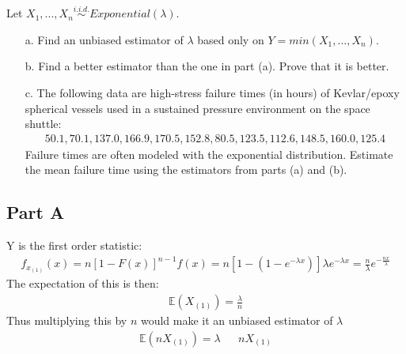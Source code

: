 \documentclass{article}
\begin{document}
Let $X_1,...,X_n \overset{i.i.d.}{\sim} Exponential(\lambda)$.
\begin{enumerate}
\item[a.] Find an unbiased estimator of $\lambda$ based only on $Y=min(X_1,...,X_n)$.
\item[b.] Find a better estimator than the one in part (a). Prove that it is better.
\item[c.] The following data are high-stress failure times (in hours) of Kevlar/epoxy spherical vessels used in a sustained pressure environment on the space shuttle:
\begin{align*}
50.1, 70.1, 137.0, 166.9, 170.5, 152.8, 80.5, 123.5, 112.6, 148.5, 160.0, 125.4
\end{align*}
Failure times are often modeled with the exponential distribution. Estimate the mean failure time using the estimators from parts (a) and (b).
\end{enumerate}
\subsection*{Part A}
Y is the first order statistic:
\begin{align*}
f_{x_{(1)}}(x) = n[1-F(x)]^{n-1} f(x) = n[1-(1-e^{-\lambda x})] \lambda e^{-\lambda x} = \frac{n}{\lambda} e^{-\frac{nx}{\lambda}}
\end{align*}
The expectation of this is then:
\begin{align*}
\mathbb{E}(X_{(1)}) = \frac{\lambda}{n}
\end{align*}
Thus multiplying this by $n$ would make it an unbiased estimator of $\lambda$
\begin{align*}
\mathbb{E}(nX_{(1)}) = \lambda && \boxed{ nX_{(1)} }
\end{align*}
\end{document}

